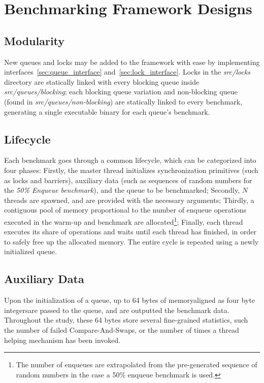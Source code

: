 \section{Benchmarking Framework Designs}
\subsection{Modularity}
New queues and locks may be added to the framework with ease by implementing
interfaces~\ref{sec:queue_interface} and~\ref{sec:lock_interface}. Locks in the
\emph{src/locks} directory are statically linked with every blocking queue
inside \emph{src/queues/blocking}; each blocking
queue variation and non-blocking queue (found in
\emph{src/queues/non-blocking}) are statically linked to every benchmark,
generating a single executable binary for each queue's benchmark. 

\subsection{Lifecycle}
Each benchmark goes through a common lifecycle, which can be categorized into
four phases: 
Firstly, the master thread initializes synchronization primitives
(such as locks and barriers), auxiliary data (such as
sequences of random numbers for the \emph{50\% Enqueue benchmark}), and the
queue to be benchmarked; 
Secondly, $N$ threads are spawned, and are provided
with the necessary arguments;
Thirdly, a contiguous pool of memory proportional
to the number of enqueue operations executed in the warm-up and benchmark are
allocated\footnote{The number of enqueues are extrapolated from the
pre-generated sequence of random numbers in the case a 50\% enqueue benchmark
is used.};
Finally, each thread executes its share of operations and waits until each
thread has finished, in order to safely free up the allocated memory. The
entire cycle is repeated using a newly initialized queue.

\subsection{Auxiliary Data}
Upon the initialization of a queue, up to 64 bytes of memory\textemdash aligned as four
byte integers\textemdash are passed to the queue, and are outputted
the benchmark data. Throughout the study, these 64
bytes store several fine-grained statistics, such the number of failed Compare-And-Swaps,
or the number of times a thread helping mechanism has been invoked.

